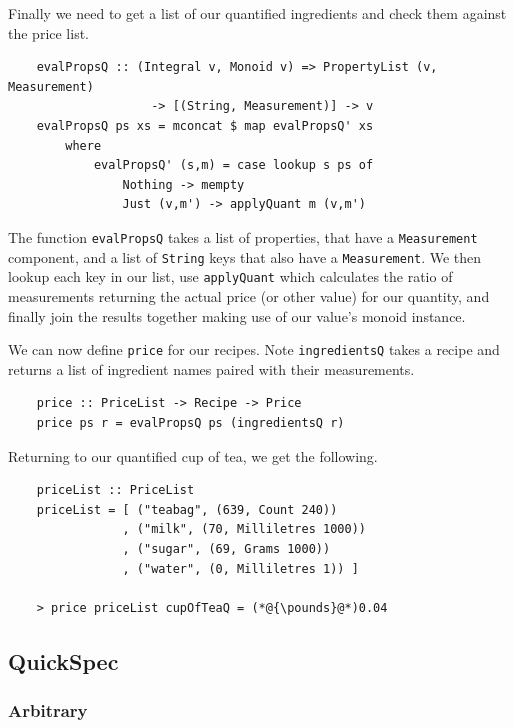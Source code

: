 \documentclass[11pt]{article}
\begin{document}
Finally we need to get a list of our quantified ingredients and check them
against the price list.

\begin{lstlisting}
    evalPropsQ :: (Integral v, Monoid v) => PropertyList (v, Measurement)
                    -> [(String, Measurement)] -> v
    evalPropsQ ps xs = mconcat $ map evalPropsQ' xs
        where
            evalPropsQ' (s,m) = case lookup s ps of
                Nothing -> mempty
                Just (v,m') -> applyQuant m (v,m')
\end{lstlisting}

The function \texttt{evalPropsQ} takes a list of properties, that have a \texttt{Measurement}
component, and a list of \texttt{String} keys that also have a \texttt{Measurement}.
We then lookup each key in our list, use \texttt{applyQuant} which calculates the ratio
of measurements returning the actual price (or other value) for our quantity, and finally
join the results together making use of our value's monoid instance.

\medbreak

We can now define \texttt{price} for our recipes. Note \texttt{ingredientsQ} takes a recipe
and returns a list of ingredient names paired with their measurements.

\begin{lstlisting}
    price :: PriceList -> Recipe -> Price
    price ps r = evalPropsQ ps (ingredientsQ r)
\end{lstlisting}

Returning to our quantified cup of tea, we get the following.

\begin{lstlisting}
    priceList :: PriceList
    priceList = [ ("teabag", (639, Count 240))
                , ("milk", (70, Milliletres 1000))
                , ("sugar", (69, Grams 1000))
                , ("water", (0, Milliletres 1)) ]

    > price priceList cupOfTeaQ = (*@{\pounds}@*)0.04
\end{lstlisting}

\subsection{QuickSpec}

\subsubsection{Arbitrary}
\end{document}
